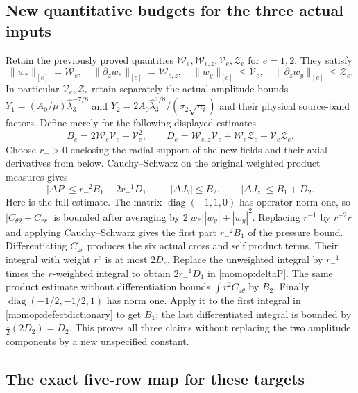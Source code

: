 \subsection{New quantitative budgets for the three actual inputs}

Retain the previously proved quantities
$\mathcal W_e,\mathcal W_{e,z},\mathcal V_e,\mathcal Z_e$ for
$e=1,2$. They satisfy
\[
 \|w_*\|_{[e]}=\mathcal W_e,\quad
 \|\partial_zw_*\|_{[e]}=\mathcal W_{e,z},\quad
 \|w_y\|_{[e]}\le\mathcal V_e,\quad
 \|\partial_zw_y\|_{[e]}\le\mathcal Z_e.
\]
In particular $\mathcal V_e,\mathcal Z_e$ retain separately the
actual amplitude bounds
$Y_1=(A_0/\mu)\widehat\lambda_3^{-7/8}$ and
$Y_2=2A_0\widehat\lambda_3^{1/8}/(\sigma_2\sqrt{n_i})$
and their physical source-band factors. Define merely for the
following displayed estimates
\[
 B_e=2\mathcal W_e\mathcal V_e+\mathcal V_e^2,\qquad
 D_e=\mathcal W_{e,z}\mathcal V_e+
                    \mathcal W_e\mathcal Z_e+\mathcal V_e\mathcal Z_e.
\]
Choose $r_->0$ enclosing the radial support of the new fields and
their axial derivatives from below. Cauchy--Schwarz on the original
weighted product measures gives
\begin{equation}\label{momop:targetbounds}
 |\Delta P|\le r_-^{-2}B_1+2r_-^{-1}D_1,\qquad
 |\Delta J_\theta|\le B_2,\qquad
 |\Delta J_z|\le B_1+D_2.
\end{equation}
Here is the full estimate. The matrix
$\operatorname{diag}(-1,1,0)$ has operator norm one, so
$|C_{\theta\theta}-C_{rr}|$ is bounded after averaging by
$2|w_*||w_y|+|w_y|^2$. Replacing $r^{-1}$ by
$r_-^{-2}r$ and applying Cauchy--Schwarz gives the first part
$r_-^{-2}B_1$ of the pressure bound. Differentiating $C_{zr}$
produces the six actual cross and self product terms. Their integral
with weight $r^e$ is at most $2D_e$. Replace the unweighted
integral by $r_-^{-1}$ times the $r$-weighted integral to obtain
$2r_-^{-1}D_1$ in \eqref{momop:deltaP}.
The same product estimate without differentiation bounds
$\int r^2C_{z\theta}$ by $B_2$.
Finally $\operatorname{diag}(-1/2,-1/2,1)$ has norm one.
Apply it to the first integral in \eqref{momop:defectdictionary}
to get $B_1$; the last differentiated integral is bounded by
$\tfrac12(2D_2)=D_2$. This proves all three claims without
replacing the two amplitude components by a new unspecified constant.

\subsection{The exact five-row map for these targets}

